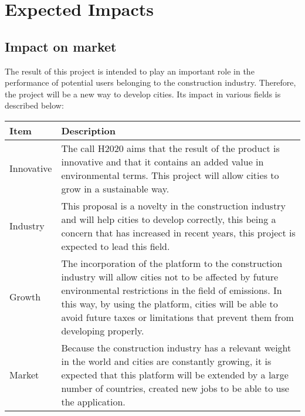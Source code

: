 \section{Expected Impacts}

\subsection{Impact on market}

The result of this project is intended to play an important role in the performance of potential users belonging to the construction industry. Therefore, the project will be a new way to develop cities. Its impact in various fields is described below:

\begin{table}[H]
	\centering
	\begin{tabular}{l p{13.3cm}}
		
		\toprule[2pt]
		
		\textbf{Item} &  \textbf{Description}\\
		
		\midrule [1.5pt]
		
		Innovative & The call H2020 aims that the result of the product is innovative and that it contains an added value in environmental terms. This project will allow cities to grow in a sustainable way.\vspace{0.2cm}\\
		
		\midrule
		
		Industry & This proposal is a novelty in the construction industry and will help cities to develop correctly, this being a concern that has increased in recent years, this project is expected to lead this field.\vspace{0.2cm}\\
		
		\midrule
		
		Growth & The incorporation of the platform to the construction industry will allow cities not to be affected by future environmental restrictions in the field of emissions. In this way, by using the platform, cities will be able to avoid future taxes or limitations that prevent them from developing properly.\vspace{0.2cm}\\
		
		\midrule
		
		Market & Because the construction industry has a relevant weight in the world and cities are constantly growing, it is expected that this platform will be extended by a large number of countries, created new jobs to be able to use the application.\vspace{0.2cm}\\
		

\end{tabular}
\end{table}
